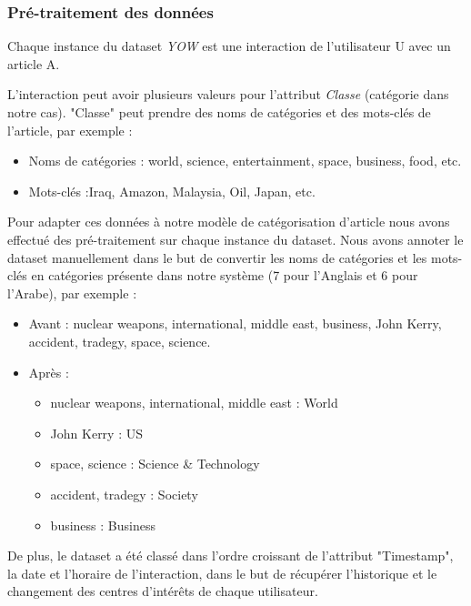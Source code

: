         \subsubsection{Pré-traitement des données}
        Chaque instance du dataset \emph{YOW} est une interaction de l'utilisateur U avec un article A.

        L'interaction peut avoir plusieurs valeurs pour l'attribut \emph{Classe} (catégorie dans notre cas). "Classe" peut prendre des noms de catégories et des mots-clés de l'article, par exemple :
        \begin{itemize}
            \item Noms de catégories : world, science, entertainment, space, business, food, etc.
            \item Mots-clés :Iraq, Amazon, Malaysia, Oil, Japan, etc.\\ 
        \end{itemize}
        Pour adapter ces données à notre modèle de catégorisation d'article nous avons effectué des pré-traitement sur chaque instance du dataset. Nous avons annoter le dataset manuellement dans le but de convertir les noms de catégories et les mots-clés en catégories présente dans notre système (7 pour l'Anglais et 6 pour l'Arabe), par exemple :
        \begin{itemize}
            \item Avant : nuclear weapons, international, middle east, business, John Kerry, accident, tradegy, space, science.
            \item Après : 
                \begin{itemize}
                    \item {nuclear weapons, international, middle east} : World
                    \item {John Kerry} : US
                    \item {space, science} : Science \& Technology
                    \item {accident, tradegy} : Society
                    \item {business} : Business\\
                \end{itemize}    
        \end{itemize}
        De plus, le dataset a été classé dans l'ordre croissant de l'attribut "Timestamp", la date et l'horaire de l'interaction, dans le but de récupérer l'historique et le changement des centres d’intérêts de chaque utilisateur. 

